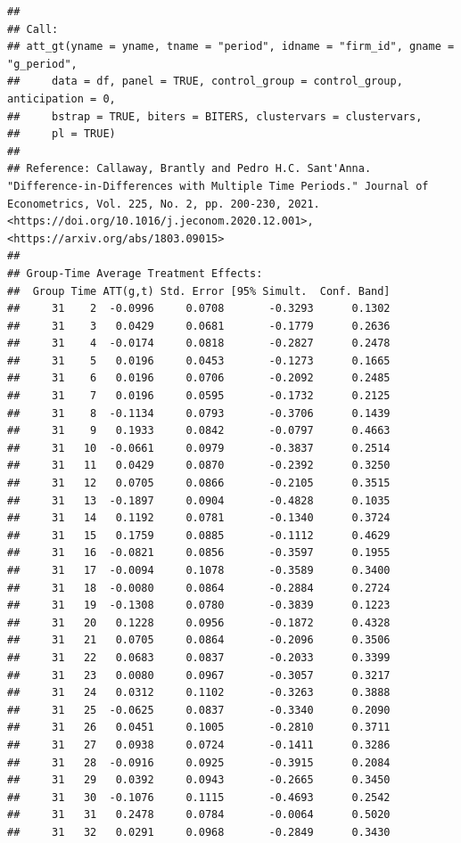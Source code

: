 \documentclass[
]{article}
\begin{document}
\begin{verbatim}
## 
## Call:
## att_gt(yname = yname, tname = "period", idname = "firm_id", gname = "g_period", 
##     data = df, panel = TRUE, control_group = control_group, anticipation = 0, 
##     bstrap = TRUE, biters = BITERS, clustervars = clustervars, 
##     pl = TRUE)
## 
## Reference: Callaway, Brantly and Pedro H.C. Sant'Anna.  "Difference-in-Differences with Multiple Time Periods." Journal of Econometrics, Vol. 225, No. 2, pp. 200-230, 2021. <https://doi.org/10.1016/j.jeconom.2020.12.001>, <https://arxiv.org/abs/1803.09015> 
## 
## Group-Time Average Treatment Effects:
##  Group Time ATT(g,t) Std. Error [95% Simult.  Conf. Band] 
##     31    2  -0.0996     0.0708       -0.3293      0.1302 
##     31    3   0.0429     0.0681       -0.1779      0.2636 
##     31    4  -0.0174     0.0818       -0.2827      0.2478 
##     31    5   0.0196     0.0453       -0.1273      0.1665 
##     31    6   0.0196     0.0706       -0.2092      0.2485 
##     31    7   0.0196     0.0595       -0.1732      0.2125 
##     31    8  -0.1134     0.0793       -0.3706      0.1439 
##     31    9   0.1933     0.0842       -0.0797      0.4663 
##     31   10  -0.0661     0.0979       -0.3837      0.2514 
##     31   11   0.0429     0.0870       -0.2392      0.3250 
##     31   12   0.0705     0.0866       -0.2105      0.3515 
##     31   13  -0.1897     0.0904       -0.4828      0.1035 
##     31   14   0.1192     0.0781       -0.1340      0.3724 
##     31   15   0.1759     0.0885       -0.1112      0.4629 
##     31   16  -0.0821     0.0856       -0.3597      0.1955 
##     31   17  -0.0094     0.1078       -0.3589      0.3400 
##     31   18  -0.0080     0.0864       -0.2884      0.2724 
##     31   19  -0.1308     0.0780       -0.3839      0.1223 
##     31   20   0.1228     0.0956       -0.1872      0.4328 
##     31   21   0.0705     0.0864       -0.2096      0.3506 
##     31   22   0.0683     0.0837       -0.2033      0.3399 
##     31   23   0.0080     0.0967       -0.3057      0.3217 
##     31   24   0.0312     0.1102       -0.3263      0.3888 
##     31   25  -0.0625     0.0837       -0.3340      0.2090 
##     31   26   0.0451     0.1005       -0.2810      0.3711 
##     31   27   0.0938     0.0724       -0.1411      0.3286 
##     31   28  -0.0916     0.0925       -0.3915      0.2084 
##     31   29   0.0392     0.0943       -0.2665      0.3450 
##     31   30  -0.1076     0.1115       -0.4693      0.2542 
##     31   31   0.2478     0.0784       -0.0064      0.5020 
##     31   32   0.0291     0.0968       -0.2849      0.3430 

\end{verbatim}
\end{document}
